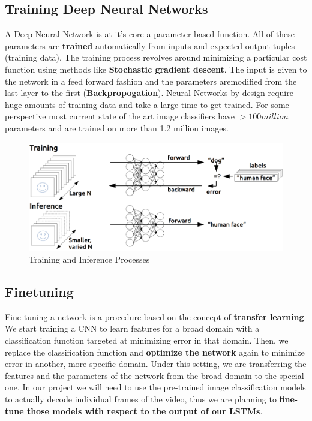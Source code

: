 \documentclass{article}
\begin{document}
				
			\subsection{Training Deep Neural Networks}
				A Deep Neural Network is at it's core a parameter based function. All of these parameters are  \textbf{trained} automatically from inputs and expected output tuples (training data). The training process revolves around minimizing a particular cost function using methods like \textbf{Stochastic gradient descent}. The input is given to the network in a feed forward fashion and the parameters aremodified from the last layer to the first (\textbf{Backpropogation}). Neural Networks by design require huge amounts of training data and take a large time to get trained. For some perspective most current state of the art image classifiers have $> 100 million$ parameters and are trained on more than 1.2 million images. 
				\begin{figure}[ht!]
					\includegraphics[width=14cm]{training_inference1.png}
					\caption{Training and Inference Processes\label{fig5}}
				\end{figure}

			\subsection{Finetuning}
				Fine-tuning a network is a procedure based on the concept of
				\textbf{transfer learning}. We start training a CNN to learn features for a broad domain with a
				classification function targeted at minimizing error in that domain. Then, we
				replace the classification function and \textbf{optimize the network} again to minimize
				error in another, more specific domain. Under this setting, we are transferring
				the features and the parameters of the network from the broad domain to the
				special one. In our project we will need to use the pre-trained image classification models 
				to actually decode individual frames of the video, thus we are planning to \textbf{fine-tune those models
				with respect to the output of our LSTMs}.
\end{document}
